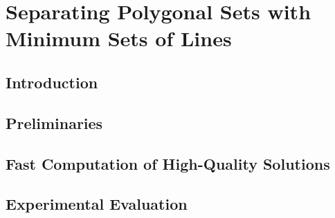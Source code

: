 \chapter{Separating Polygonal Sets with Minimum Sets of Lines}
\thispagestyle{myheadings}

\section{Introduction}
\label{sec:gs-intro}

\section{Preliminaries}\label{sec:gs-preliminary}


\label{sec:gs-structure}

\section{Fast Computation of High-Quality Solutions}\label{sec:gs-algorithm}


\section{Experimental Evaluation}\label{sec:gs-evaluation}
